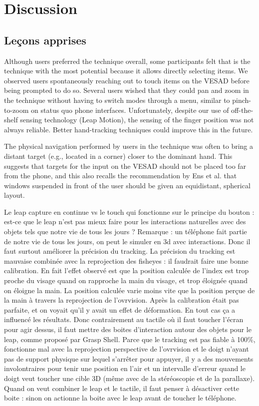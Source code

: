 \chapter{Discussion}
\label{ch:discussion}

\section{Leçons apprises}
\label{sec:discussion_lessons}
Although users preferred the  technique overall, some participants felt that  is the technique with the most potential because it allows directly selecting items. We observed users spontaneously reaching out to touch items on the VESAD before being prompted to do so. Several users wished that they could pan and zoom in the  technique without having to switch modes through a menu, similar to pinch-to-zoom on status quo phone interfaces. Unfortunately, despite our use of off-the-shelf sensing technology (Leap Motion), the sensing of the finger position was not always reliable. Better hand-tracking techniques \cite{Taylor2016} could improve this in the future.

The physical navigation performed by users in the  technique was often to bring a distant target (e.g., located in a corner) closer to the dominant hand. This suggests that targets for the input on the VESAD should not be placed too far from the phone, and this also recalls the recommendation by Ens et al. \cite{Ens2014} that windows suspended in front of the user should be given an equidistant, spherical layout.

Le leap capture en continue vs le touch qui fonctionne sur le principe du bouton : est-ce que le leap n'est pas mieux faire pour les interactions naturelles avec des objets tels que notre vie de tous les jours ? Remarque : un téléphone fait partie de notre vie de tous les jours, on peut le simuler en 3d avec interactions. Donc il faut surtout améliorer la précision du tracking.
La précision du tracking est mauvaise combinée avec la reprojection des fisheyes : il faudrait faire une bonne calibration. En fait l'effet observé est que la position calculée de l'index est trop proche du visage quand on rapproche la main du visage, et trop éloignée quand on éloigne la main. La position calculée varie moins vite que la position perçue de la main à travers la reprojection de l'ovrvision. Après la calibration était pas parfaite, et on voyait qu'il y avait un effet de déformation. En tout cas ça a influencé les résultats.
Donc contrairement au tactile où il faut toucher l'écran pour agir dessus, il faut mettre des boites d'interaction autour des objets pour le leap, comme proposé par Grasp Shell. Parce que le tracking est pas fiable à 100\%, fonctionne mal avec la reprojection perspective de l'ovrvision et le doigt n'ayant pas de support physique sur lequel s'arrêter pour appuyer, il y a des mouvements involontraires pour tenir une position en l'air et un intervalle d'erreur quand le doigt veut toucher une cible 3D (même avec de la stéréoscopie et de la parallaxe).
Quand on veut combiner le leap et le tactile, il faut penser à désactiver cette boite : sinon on actionne la boite avec le leap avant de toucher le téléphone.


